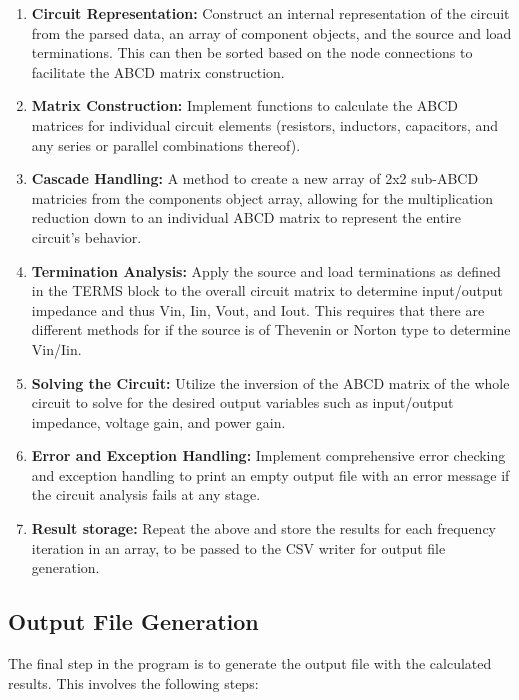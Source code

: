 \documentclass[a4paper]{article}
\begin{document}
\begin{enumerate}
    \item \textbf{Circuit Representation:} Construct an internal representation of the circuit from the parsed data, an array of component objects, and the source and load terminations. This can then be sorted based on the node connections to facilitate the ABCD matrix construction.
    \item \textbf{Matrix Construction:} Implement functions to calculate the ABCD matrices for individual circuit elements (resistors, inductors, capacitors, and any series or parallel combinations thereof).
    \item \textbf{Cascade Handling:} A method to create a new array of 2x2 sub-ABCD matricies from the components object array, allowing for the multiplication reduction down to an individual ABCD matrix to represent the entire circuit's behavior.
    \item \textbf{Termination Analysis:} Apply the source and load terminations as defined in the TERMS block to the overall circuit matrix to determine input/output impedance and thus Vin, Iin, Vout, and Iout.
    This requires that there are different methods for if the source is of Thevenin or Norton type to determine Vin/Iin.
    \item \textbf{Solving the Circuit:} Utilize the inversion of the ABCD matrix of the whole circuit to solve for the desired output variables such as input/output impedance, voltage gain, and power gain.
    \item \textbf{Error and Exception Handling:} Implement comprehensive error checking and exception handling to print an empty output file with an error message if the circuit analysis fails at any stage.
    \item \textbf{Result storage:} Repeat the above and store the results for each frequency iteration in an array, to be passed to the CSV writer for output file generation.
\end{enumerate}

\subsection*{Output File Generation}
The final step in the program is to generate the output file with the calculated results. This involves the following steps:
\end{document}
